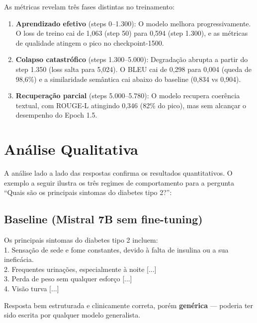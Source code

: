 As métricas revelam três fases distintas no treinamento:

\begin{enumerate}
    \item \textbf{Aprendizado efetivo} (steps 0--1.300): O modelo melhora progressivamente. O loss de treino cai de 1,063 (step 50) para 0,594 (step 1.300), e as métricas de qualidade atingem o pico no checkpoint-1500.
    \item \textbf{Colapso catastrófico} (steps 1.300--5.000): Degradação abrupta a partir do step 1.350 (loss salta para 5,024). O BLEU cai de 0,298 para 0,004 (queda de 98,6\%) e a similaridade semântica cai abaixo do baseline (0,834 vs 0,904).
    \item \textbf{Recuperação parcial} (steps 5.000--5.780): O modelo recupera coerência textual, com ROUGE-L atingindo 0,346 (82\% do pico), mas sem alcançar o desempenho do Epoch 1.5.
\end{enumerate}

\section{Análise Qualitativa}
\label{sec:analise-qualitativa}

A análise lado a lado das respostas confirma os resultados quantitativos. O exemplo a seguir ilustra os três regimes de comportamento para a pergunta ``Quais são os principais sintomas do diabetes tipo 2?'':

\subsection{Baseline (Mistral 7B sem fine-tuning)}

\begin{tcolorbox}[colback=code-bg, colframe=fiap-gray, fontupper=\small\ttfamily]
Os principais sintomas do diabetes tipo 2 incluem:\\
1. Sensação de sede e fome constantes, devido à falta de insulina ou a sua ineficácia.\\
2. Frequentes urinações, especialmente à noite [...]\\
3. Perda de peso sem qualquer esforço [...]\\
4. Visão turva [...]
\end{tcolorbox}

Resposta bem estruturada e clinicamente correta, porém \textbf{genérica} --- poderia ter sido escrita por qualquer modelo generalista.

